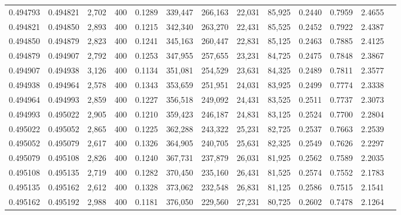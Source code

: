 \begin{tabular}{rrrrrrrrrrrrr}
0.494793 & 0.494821 &  2,702 & 400 &                                     0.1289 & 339,447 & 266,163 &  22,031 &  85,925 & 0.2440 & 0.7959 & 2.4655 \\
0.494821 & 0.494850 &  2,893 & 400 &                                     0.1215 & 342,340 & 263,270 &  22,431 &  85,525 & 0.2452 & 0.7922 & 2.4387 \\
0.494850 & 0.494879 &  2,823 & 400 &                                     0.1241 & 345,163 & 260,447 &  22,831 &  85,125 & 0.2463 & 0.7885 & 2.4125 \\
0.494879 & 0.494907 &  2,792 & 400 &                                     0.1253 & 347,955 & 257,655 &  23,231 &  84,725 & 0.2475 & 0.7848 & 2.3867 \\
0.494907 & 0.494938 &  3,126 & 400 &                                     0.1134 & 351,081 & 254,529 &  23,631 &  84,325 & 0.2489 & 0.7811 & 2.3577 \\
0.494938 & 0.494964 &  2,578 & 400 &                                     0.1343 & 353,659 & 251,951 &  24,031 &  83,925 & 0.2499 & 0.7774 & 2.3338 \\
0.494964 & 0.494993 &  2,859 & 400 &                                     0.1227 & 356,518 & 249,092 &  24,431 &  83,525 & 0.2511 & 0.7737 & 2.3073 \\
0.494993 & 0.495022 &  2,905 & 400 &                                     0.1210 & 359,423 & 246,187 &  24,831 &  83,125 & 0.2524 & 0.7700 & 2.2804 \\
0.495022 & 0.495052 &  2,865 & 400 &                                     0.1225 & 362,288 & 243,322 &  25,231 &  82,725 & 0.2537 & 0.7663 & 2.2539 \\
0.495052 & 0.495079 &  2,617 & 400 &                                     0.1326 & 364,905 & 240,705 &  25,631 &  82,325 & 0.2549 & 0.7626 & 2.2297 \\
0.495079 & 0.495108 &  2,826 & 400 &                                     0.1240 & 367,731 & 237,879 &  26,031 &  81,925 & 0.2562 & 0.7589 & 2.2035 \\
0.495108 & 0.495135 &  2,719 & 400 &                                     0.1282 & 370,450 & 235,160 &  26,431 &  81,525 & 0.2574 & 0.7552 & 2.1783 \\
0.495135 & 0.495162 &  2,612 & 400 &                                     0.1328 & 373,062 & 232,548 &  26,831 &  81,125 & 0.2586 & 0.7515 & 2.1541 \\
0.495162 & 0.495192 &  2,988 & 400 &                                     0.1181 & 376,050 & 229,560 &  27,231 &  80,725 & 0.2602 & 0.7478 & 2.1264 \\

\end{tabular}
